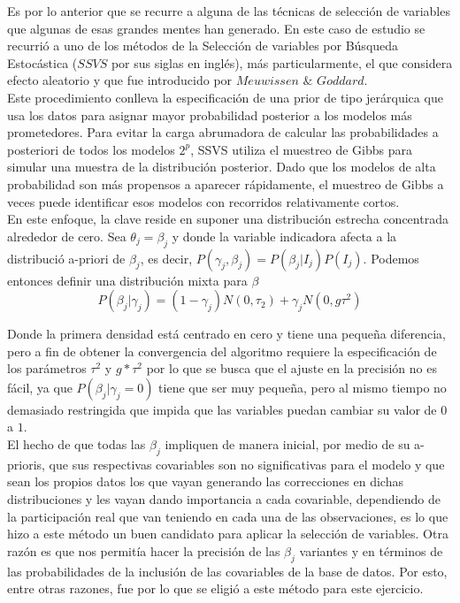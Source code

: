 \documentclass[DIV=calc, 
					paper=letter, 
					fontsize=11pt, 
					twocolumn]{scrartcl}
\begin{document}
Es por lo anterior que se recurre a alguna de las t\'ecnicas de selecci\'on de variables que algunas de esas grandes mentes han generado. En este caso de estudio se recurri\'o a uno de los m\'etodos de la Selecci\'on de variables por B\'usqueda Estoc\'astica ($SSVS$ por sus siglas en ingl\'es), m\'as particularmente, el que considera efecto aleatorio y que fue introducido por $Meuwissen$ $\&$ $Goddard$.\\



Este procedimiento conlleva la especificaci\'on de una prior de tipo jer\'arquica que usa los datos para asignar mayor probabilidad posterior a los modelos más prometedores. Para evitar la carga abrumadora de calcular las probabilidades a posteriori de todos los modelos $2^p$, SSVS utiliza el muestreo de Gibbs para simular una muestra de la distribuci\'on posterior. Dado que los modelos de alta probabilidad son m\'as propensos a aparecer r\'apidamente, el muestreo de Gibbs a veces puede identificar esos modelos con recorridos relativamente cortos.\\

En este enfoque, la clave reside en suponer una distribuci\'on estrecha concentrada alrededor de cero. Sea $\theta_j= \beta_j$ y donde la variable indicadora afecta a la distribuci\'o a-priori de $\beta_j$, es decir,  $P (\gamma_j, \beta_j) = P (\beta_j | I_j) P (I_j)$. Podemos entonces definir una distribuci\'on mixta para $\beta$ 
\begin{equation}
P (\beta_j | \gamma_j) = (1 - \gamma_j) N (0, \tau_2) + \gamma_j N (0, g\tau^2)
\end{equation}

Donde la primera densidad est\'a centrado en cero y tiene una peque\~na diferencia, pero a fin de obtener la convergencia del algoritmo requiere la especificaci\'on de los par\'ametros $\tau^2$ y $g*\tau^2$ por lo que se busca que el ajuste en la precisi\'on no es f\'acil, ya que $P (\beta_j | \gamma_j = 0)$ tiene que ser muy peque\~na, pero al mismo tiempo no demasiado restringida que impida que las variables puedan cambiar su valor de $0$ a $1$.\\

El hecho de que todas las $\beta_j$ impliquen de manera inicial, por medio de su a-prioris, que sus respectivas covariables son no significativas para el modelo y que sean los propios datos los que vayan generando las correcciones en dichas distribuciones y les vayan dando importancia a cada covariable, dependiendo de la participaci\'on real que van teniendo en cada una de las observaciones, es lo que hizo a este m\'etodo un buen candidato para aplicar la selecci\'on de variables. Otra raz\'on es que nos permit\'ia hacer la precisi\'on de las $\beta_j$ variantes y en t\'erminos de las probabilidades de la inclusi\'on de las covariables de la base de datos. Por esto, entre otras razones, fue por lo que se eligi\'o a este m\'etodo para este ejercicio.\\
\end{document}
